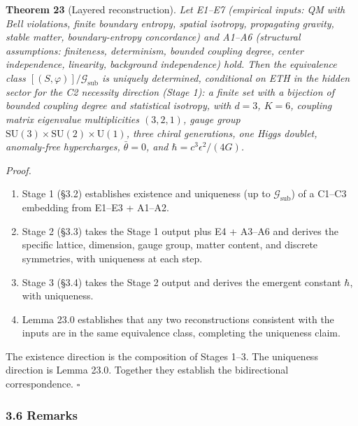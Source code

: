 \documentclass[
]{article}
\begin{document}
\textbf{Theorem 23} (Layered reconstruction). \emph{Let E1--E7
(empirical inputs: QM with Bell violations, finite boundary entropy,
spatial isotropy, propagating gravity, stable matter, boundary-entropy
concordance) and A1--A6 (structural assumptions: finiteness,
determinism, bounded coupling degree, center independence, linearity,
background independence) hold. Then the equivalence class
\([(S, \varphi)]/\mathcal{G}_{\text{sub}}\) is uniquely determined,
conditional on ETH in the hidden sector for the C2 necessity direction
(Stage 1): a finite set with a bijection of bounded coupling degree and
statistical isotropy, with \(d = 3\), \(K = 6\), coupling matrix
eigenvalue multiplicities \((3, 2, 1)\), gauge group
\(\text{SU}(3) \times \text{SU}(2) \times \text{U}(1)\), three chiral
generations, one Higgs doublet, anomaly-free hypercharges,
\(\bar\theta = 0\), and \(\hbar = c^3 \epsilon^2/(4G)\).}

\emph{Proof.}

\begin{enumerate}
\def\labelenumi{(\arabic{enumi})}
\item
  Stage 1 (§3.2) establishes existence and uniqueness (up to
  \(\mathcal{G}_{\text{sub}}\)) of a C1--C3 embedding from E1--E3 +
  A1--A2.
\item
  Stage 2 (§3.3) takes the Stage 1 output plus E4 + A3--A6 and derives
  the specific lattice, dimension, gauge group, matter content, and
  discrete symmetries, with uniqueness at each step.
\item
  Stage 3 (§3.4) takes the Stage 2 output and derives the emergent
  constant \(\hbar\), with uniqueness.
\item
  Lemma 23.0 establishes that any two reconstructions consistent with
  the inputs are in the same equivalence class, completing the
  uniqueness claim.
\end{enumerate}

The existence direction is the composition of Stages 1--3. The
uniqueness direction is Lemma 23.0. Together they establish the
bidirectional correspondence. \(\square\)

\hypertarget{remarks}{%
\subsubsection{3.6 Remarks}\label{remarks}}
\end{document}
